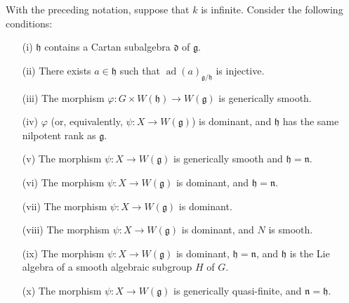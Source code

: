 \begin{theorem}
With the preceding notation, suppose that \(k\) is infinite. Consider
the following conditions:
\begin{enumerate}
  \item[(i)]
  \(\mathfrak h\) contains a Cartan subalgebra \(\mathfrak d\) of
  \(\mathfrak g\).

  \item[(ii)]
  There exists \(a\in\mathfrak h\) such that
  \(\operatorname{ad}(a)_{\mathfrak g/\mathfrak h}\) is injective.

  \item[(iii)]
  The morphism
  \(\varphi:G\times W(\mathfrak h)\to W(\mathfrak g)\) is generically
  smooth.

  \item[(iv)]
   \(\varphi\) (or, equivalently,
  \(\psi:X\to W(\mathfrak g)\)) is dominant, and \(\mathfrak h\) has
  the same nilpotent rank as \(\mathfrak g\).

  \item[(v)]
  The morphism \(\psi:X\to W(\mathfrak g)\) is generically smooth and
  \(\mathfrak h=\mathfrak n\).

  \item[(vi)]
  The morphism \(\psi:X\to W(\mathfrak g)\) is dominant, and
  \(\mathfrak h=\mathfrak n\).

  \item[(vii)]
  The morphism \(\psi:X\to W(\mathfrak g)\) is dominant.

  \item[(viii)]
  The morphism \(\psi:X\to W(\mathfrak g)\) is dominant, and \(N\) is
  smooth.

  \item[(ix)]
  The morphism \(\psi:X\to W(\mathfrak g)\) is dominant,
  \(\mathfrak h=\mathfrak n\), and \(\mathfrak h\) is the Lie algebra
  of a smooth algebraic subgroup \(H\) of \(G\).

  \item[(x)]
  The morphism \(\psi:X\to W(\mathfrak g)\) is generically
  quasi-finite, and \(\mathfrak n=\mathfrak h\).


\end{enumerate}
\end{theorem}
